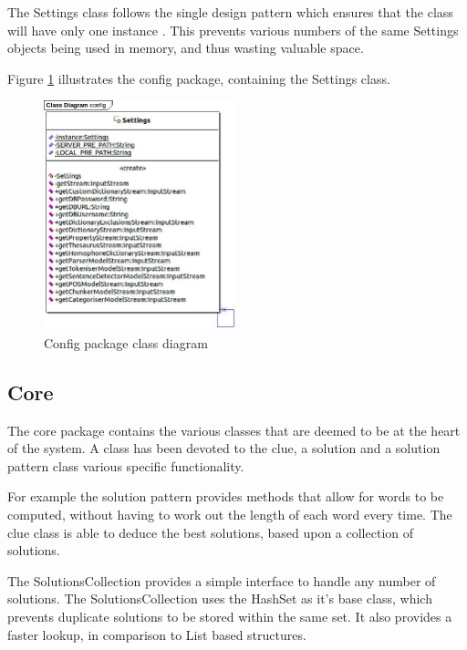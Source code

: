 The Settings class follows the single design pattern which ensures that the 
class will have only one instance \citep{gof}. This prevents various numbers of
the same Settings objects being used in memory, and thus wasting valuable space.

Figure \ref{fig:config_package} illustrates the config package, containing the 
Settings class.

\begin{figure}[H]
  \centering
  \includegraphics[width=0.5\textwidth]{design/class/config.jpg}
  \caption{Config package class diagram}
  \label{fig:config_package}
\end{figure}


\subsection{Core}
\label{sub:core}

The core package contains the various classes that are deemed to be at the heart
of the system. A class has been devoted to the clue, a solution and a solution 
pattern class various specific functionality.

For example the solution pattern provides methods that allow for words to be 
computed, without having to work out the length of each word every time. The 
clue class is able to deduce the best solutions, based upon a collection of 
solutions.

The SolutionsCollection provides a simple interface to handle any number of 
solutions. The SolutionsCollection uses the HashSet as it's base class, which 
prevents duplicate solutions to be stored within the same set. It also provides
a faster lookup, in comparison to List based structures.

